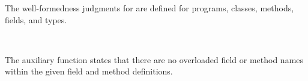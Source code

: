 \documentclass[acmlarge, anonymous, authordraft]{acmart}
\begin{document}
The well-formedness judgments for \kafka are defined for programs, classes, methods, fields, and types.

~\\


\begin{mathpar}
\end{mathpar}


\begin{mathpar}
\end{mathpar}

The  auxiliary function states that there are no overloaded 
field or method names within the given field and method definitions. \\

\begin{mathpar}

\end{mathpar}

\begin{mathpar}
\end{mathpar}
 
\begin{mathpar}

\end{mathpar}
\end{document}
